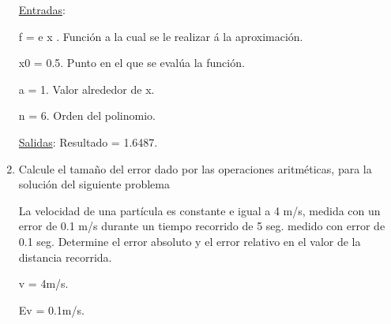 \documentclass[12pt]{article}
\renewcommand{\_}{\kern-1.5pt\textunderscore\kern-1.5pt}
\begin{document}
\begin{enumerate}
\begin{justify}
\uline{Entradas}: 
\end{justify}\par

\begin{justify}
f = e x . Función a la cual se le realizar á la aproximación. 
\end{justify}\par

\begin{justify}
x0 = 0.5. Punto en el que se evalúa la función. 
\end{justify}\par

\begin{justify}
a = 1. Valor alrededor de x. 
\end{justify}\par

\begin{justify}
n = 6. Orden del polinomio. 
\end{justify}\par

\begin{justify}
\uline{Salidas}: Resultado = 1.6487.
\end{justify}\par


\vspace{\baselineskip}
	\item Calcule el tamaño del error dado por las operaciones aritméticas, para la solución del siguiente problema\par


\vspace{\baselineskip}
\begin{justify}
La velocidad de una partícula es constante e igual a 4 m/s, medida con un error de 0.1 m/s durante un tiempo recorrido de 5 seg. medido con error de 0.1 seg. Determine el error absoluto y el error relativo en el valor de la distancia recorrida.
\end{justify}\par

\begin{justify}
 v = 4m/s. 
\end{justify}\par

\begin{justify}
Ev = 0.1m/s. 
\end{justify}\par


\end{enumerate}
\end{document}
